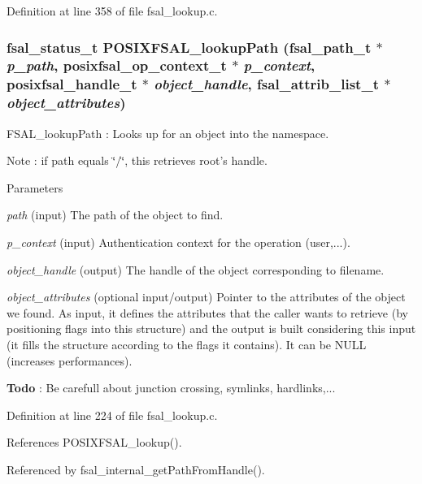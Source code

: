 Definition at line 358 of file fsal\_\-lookup.c.
\subsubsection[{POSIXFSAL\_\-lookupPath}]{\setlength{\rightskip}{0pt plus 5cm}fsal\_\-status\_\-t POSIXFSAL\_\-lookupPath (fsal\_\-path\_\-t $\ast$ {\em p\_\-path}, \/  posixfsal\_\-op\_\-context\_\-t $\ast$ {\em p\_\-context}, \/  posixfsal\_\-handle\_\-t $\ast$ {\em object\_\-handle}, \/  fsal\_\-attrib\_\-list\_\-t $\ast$ {\em object\_\-attributes})}\label{fsal__lookup_8c_a26385f9f9a87162ad7a42f52dbe2c8e0}
FSAL\_\-lookupPath : Looks up for an object into the namespace.

Note : if path equals \char`\"{}/\char`\"{}, this retrieves root's handle.


\begin{DoxyParams}{Parameters}
\item[{\em path}](input) The path of the object to find. \item[{\em p\_\-context}](input) Authentication context for the operation (user,...). \item[{\em object\_\-handle}](output) The handle of the object corresponding to filename. \item[{\em object\_\-attributes}](optional input/output) Pointer to the attributes of the object we found. As input, it defines the attributes that the caller wants to retrieve (by positioning flags into this structure) and the output is built considering this input (it fills the structure according to the flags it contains). It can be NULL (increases performances). \end{DoxyParams}


\begin{Desc}
\item[{\bf Todo}]: Be carefull about junction crossing, symlinks, hardlinks,... \end{Desc}


Definition at line 224 of file fsal\_\-lookup.c.

References POSIXFSAL\_\-lookup().

Referenced by fsal\_\-internal\_\-getPathFromHandle().